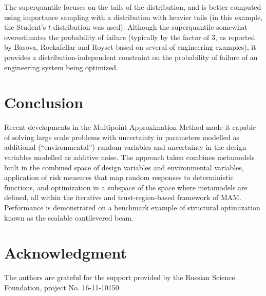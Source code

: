 \documentclass{llncs}
\begin{document}
The superquantile focuses on the tails of the distribution, and is better computed using importance sampling with a distribution with heavier tails (in this example, the Student's $t$-distribution was used). Although the superquantile somewhat overestimates the probability of failure (typically by the factor of 3, as reported by Basova, Rockafellar and Royset \cite{BasovaRockafellarRoyset} based on several of engineering examples), it provides a distribution-independent constraint on the probability of failure of an engineering system being optimized.

\section{Conclusion}
\label{sec:conclusion}

Recent developments in the Multipoint Approximation Method made it capable of solving large scale problems with uncertainty in parameters modelled as additional (``environmental'') random variables and uncertainty in the design variables modelled as additive noise. The approach taken combines metamodels built in the combined space of design variables and environmental variables, application of risk measures that map random responses to deterministic functions, and optimization in a subspace of the space where metamodels are defined, all within the iterative and trust-region-based framework of MAM. Performance is demonstrated on a benchmark example of structural optimization known as the scalable cantilevered beam.

\section*{Acknowledgment}
The authors are grateful for the support provided by the Russian Science Foundation, project No. 16-11-10150.

%
\end{document}
